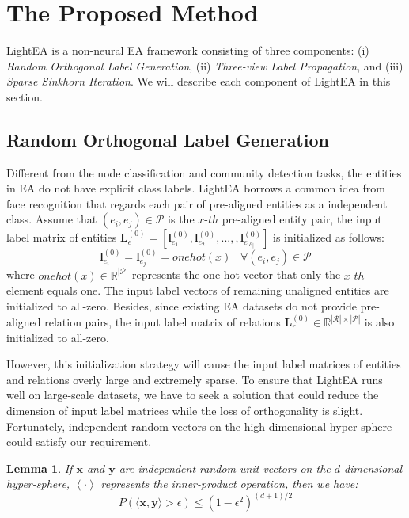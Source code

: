 \documentclass[11pt]{article}
\newtheorem{lemma}{Lemma}
\begin{document}
\section{The Proposed Method}
LightEA is a non-neural EA framework consisting of three components: (i) \emph{Random Orthogonal Label Generation}, (ii) \emph{Three-view Label Propagation}, and (iii) \emph{Sparse Sinkhorn Iteration}.
We will describe each component of LightEA in this section.

\subsection{Random Orthogonal Label Generation}
Different from the node classification and community detection tasks, the entities in EA do not have explicit class labels.
LightEA borrows a common idea from face recognition \cite{DBLP:journals/spl/WangCLL18,DBLP:conf/cvpr/DengGXZ19} that regards each pair of pre-aligned entities as a independent class.
Assume that $(e_i,e_j)\in \mathcal{P}$ is the $x$-$th$ pre-aligned entity pair, the input label matrix of entities $\bm L^{(0)}_e = \left[\bm l^{(0)}_{e_1},\bm l^{(0)}_{e_2},...,,\bm l^{(0)}_{e_{|\mathcal{E}|}}\right]$ is initialized as follows:
\begin{equation}
    \bm l^{(0)}_{e_i}=\bm l^{(0)}_{e_j}=onehot(x)\;\;\;\forall(e_i,e_j)\in \mathcal{P}
\end{equation}
where $onehot(x) \in \mathbb{R}^{|\mathcal{P}|}  $ represents the one-hot vector that only the $x$-$th$ element equals one.
The input label vectors of remaining unaligned entities are initialized to all-zero.
Besides, since existing EA datasets do not provide pre-aligned relation pairs, the input label matrix of relations $\bm L^{(0)}_r \in \mathbb{R}^{|\mathcal{R}|\times|\mathcal{P}|}$ is also initialized to all-zero.

However, this initialization strategy will cause the input label matrices of entities and relations overly large and extremely sparse.
To ensure that LightEA runs well on large-scale datasets, we have to seek a solution that could reduce the dimension of input label matrices while the loss of orthogonality is slight.
Fortunately, independent random vectors on the high-dimensional hyper-sphere could satisfy our requirement.
\begin{lemma}
If $\bm x$ and $\bm y$ are independent random unit vectors on the $d$-dimensional hyper-sphere, $\left\langle\cdot\right\rangle$ represents the inner-product operation, then we have:
\begin{equation}
    P\left(\langle\bm x,\bm y\rangle > \epsilon\right) \leq (1-\epsilon^2)^{(d+1)/2}
\end{equation}
\label{lemma:1}
\end{lemma}
\end{document}
